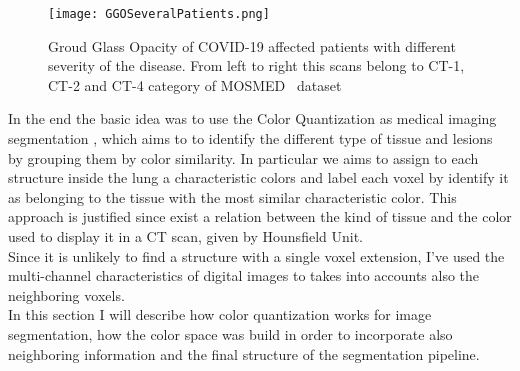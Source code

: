 	\begin{figure}[h!]
		\centering
			\texttt{[image: GGOSeveralPatients.png]}
		\caption{Groud Glass Opacity of COVID-19 affected patients with different severity of the disease. From left to right this scans belong to CT-1, CT-2 and CT-4 category of MOSMED~\cite{DATA:MOSMED} dataset}
	\label{fig:GGO-Spatial}
	\end{figure}
	
	In the end the basic idea was to use the Color Quantization as medical imaging segmentation , which aims to to identify the different type of tissue and lesions by grouping them by color similarity. In particular we aims to assign to each structure inside the lung a characteristic colors and label each voxel by identify it as belonging to the tissue with the most similar characteristic color. This approach is justified since exist a relation between the kind of tissue and the color used to display it in a CT scan, given by Hounsfield Unit.\\
	Since it is unlikely to find a structure with a single voxel extension, I've used the multi-channel characteristics of digital images to takes into accounts also the neighboring voxels.\\
	
	In this section I will describe how color quantization works for image segmentation, how the color space was build in order to incorporate also neighboring information and the final structure of the segmentation pipeline.

